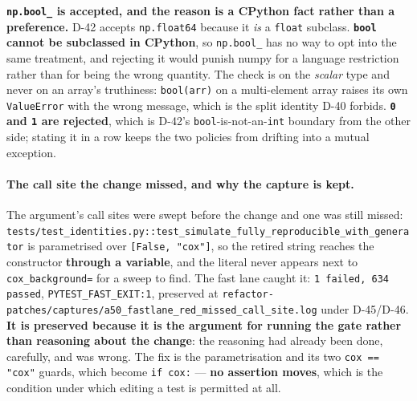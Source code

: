 \documentclass[
  10pt,
]{article}
\begin{document}
\textbf{\texttt{np.bool\_} is accepted, and the reason is a CPython fact rather than a preference.} D-42 accepts \texttt{np.float64} because it \emph{is} a \texttt{float} subclass. \textbf{\texttt{bool} cannot be subclassed in CPython}, so \texttt{np.bool\_} has no way to opt into the same treatment, and rejecting it would punish numpy for a language restriction rather than for being the wrong quantity. The check is on the \emph{scalar} type and never on an array's truthiness: \texttt{bool(arr)} on a multi-element array raises its own \texttt{ValueError} with the wrong message, which is the split identity D-40 forbids. \textbf{\texttt{0} and \texttt{1} are rejected}, which is D-42's \texttt{bool}-is-not-an-\texttt{int} boundary from the other side; stating it in a row keeps the two policies from drifting into a mutual exception.

\paragraph{The call site the change missed, and why the capture is kept.}
The argument's call sites were swept before the change and one was still missed: \texttt{tests/\allowbreak{}test\_identities.py::\allowbreak{}test\_simulate\_fully\_reproducible\_with\_generator} is parametrised over \texttt{[False, "cox"]}, so the retired string reaches the constructor \textbf{through a variable}, and the literal never appears next to \texttt{cox\_background=} for a sweep to find. The fast lane caught it: \texttt{1 failed, 634 passed}, \texttt{PYTEST\_FAST\_EXIT:1}, preserved at \texttt{refactor-patches/\allowbreak{}captures/\allowbreak{}a50\_fastlane\_red\_missed\_call\_site.log} under D-45/D-46. \textbf{It is preserved because it is the argument for running the gate rather than reasoning about the change}: the reasoning had already been done, carefully, and was wrong. The fix is the parametrisation and its two \texttt{cox == "cox"} guards, which become \texttt{if cox:} --- \textbf{no assertion moves}, which is the condition under which editing a test is permitted at all.
\end{document}
